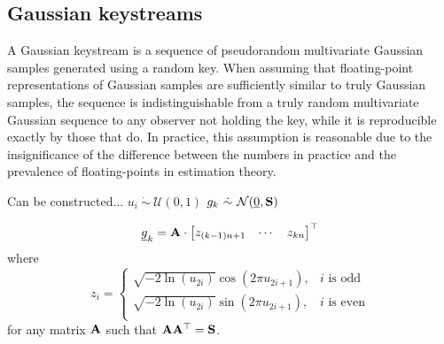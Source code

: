 \documentclass[conference]{IEEEtran}
\begin{document}
% 
% 

\subsection{Gaussian keystreams}\label{subsec:gauss_keystreams}
A Gaussian keystream is a sequence of pseudorandom multivariate Gaussian samples generated using a random key. When assuming that floating-point representations of Gaussian samples are sufficiently similar to truly Gaussian samples, the sequence is indistinguishable from a truly random multivariate Gaussian sequence to any observer not holding the key, while it is reproducible exactly by those that do. In practice, this assumption is reasonable due to the insignificance of the difference between the numbers in practice and the prevalence of floating-points in estimation theory.

Can be constructed...
$u_i\ \dot{\sim}\ \mathcal{U}(0,1)$
$g_k\ \dot{\sim}\ \mathcal{N}(\vec{0},\mat{S})$

\begin{equation}
  {\underline{g}}_k = {{\mathbf{A}}} \cdot 
  \begin{bmatrix}
    z_{(k-1)n+1} & \cdots & z_{kn}
  \end{bmatrix}^\top
\end{equation}
where 
\begin{equation}
  z_i =
  \begin{cases}
    \sqrt{-2\ln(u_{2i})}\cos(2\pi u_{2i+1}), & i \text{ is odd}\\
    \sqrt{-2\ln(u_{2i})}\sin(2\pi u_{2i+1}), & i \text{ is even}\\
  \end{cases}
\end{equation}
for any matrix ${{\mathbf{A}}}$ such that ${{\mathbf{A}}}{{\mathbf{A}}}^\top = {{\mathbf{S}}}$.
\end{document}
